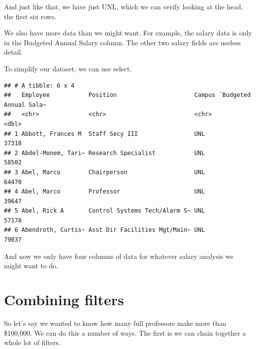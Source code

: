 \documentclass[]{book}
\newenvironment{Shaded}{\begin{snugshade}}{\end{snugshade}}
\newcommand{\DataTypeTok}[1]{\textcolor[rgb]{0.13,0.29,0.53}{#1}}
\newcommand{\DecValTok}[1]{\textcolor[rgb]{0.00,0.00,0.81}{#1}}
\newcommand{\KeywordTok}[1]{\textcolor[rgb]{0.13,0.29,0.53}{\textbf{#1}}}
\newcommand{\NormalTok}[1]{#1}
\newcommand{\OperatorTok}[1]{\textcolor[rgb]{0.81,0.36,0.00}{\textbf{#1}}}
\newcommand{\StringTok}[1]{\textcolor[rgb]{0.31,0.60,0.02}{#1}}
\begin{document}
And just like that, we have just UNL, which we can verify looking at the head, the first six rows.

We also have more data than we might want. For example, the salary data is only in the Budgeted Annual Salary column. The other two salary fields are useless detail.

To simplify our dataset, we can use select.

\begin{Shaded}
\end{Shaded}

\begin{verbatim}
## # A tibble: 6 x 4
##   Employee           Position                      Campus `Budgeted Annual Sala~
##   <chr>              <chr>                         <chr>                   <dbl>
## 1 Abbott, Frances M  Staff Secy III                UNL                     37318
## 2 Abdel-Monem, Tari~ Research Specialist           UNL                     58502
## 3 Abel, Marco        Chairperson                   UNL                     64470
## 4 Abel, Marco        Professor                     UNL                     39647
## 5 Abel, Rick A       Control Systems Tech/Alarm S~ UNL                     57178
## 6 Abendroth, Curtis~ Asst Dir Facilities Mgt/Main~ UNL                     79037
\end{verbatim}

And now we only have four columns of data for whatever salary analysis we might want to do.

\hypertarget{combining-filters}{%
\section{Combining filters}\label{combining-filters}}

So let's say we wanted to know how many full professors make more than \$100,000. We can do this a number of ways. The first is we can chain together a whole lot of filters.

\begin{Shaded}
\end{Shaded}
\end{document}
